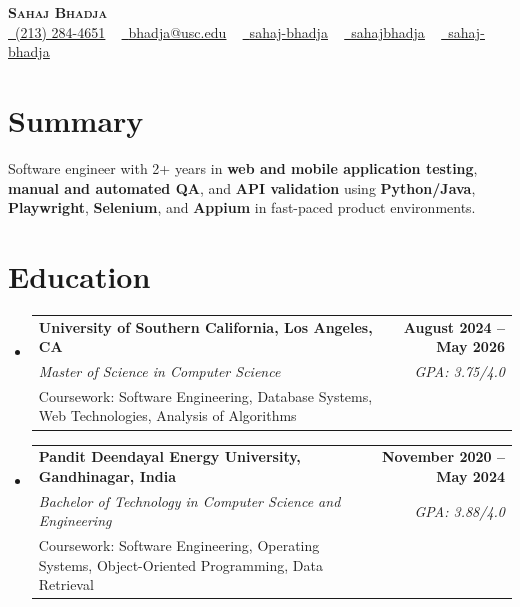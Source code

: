 \documentclass[letterpaper,10pt]{article}
\makeatletter
\newcommand{\resumeEduSubheading}[5]{\vspace{-1pt}\item\begin{tabular*}{1.0\textwidth}[t]{l@{\extracolsep{\fill}}r}\textbf{#1} & \textbf{\small #2} \\\textit{\small #3} & \textit{\small #4} \\\small #5 & \\\end{tabular*}\vspace{-4pt}}
\newcommand{\resumeSubHeadingListStart}{\begin{itemize}[leftmargin=0.0in, label={}]}
\newcommand{\resumeSubHeadingListEnd}{\end{itemize}}
\makeatother
\begin{document}
\begin{center}
{\Huge \scshape \textbf{Sahaj Bhadja}} \\ \vspace{1pt}
\small \href{tel:(213) 284-4651}{\faPhone\ \underline{(213) 284-4651}} ~ \href{mailto:bhadja@usc.edu}{\raisebox{-0.2\height}\faEnvelope\ \underline{bhadja@usc.edu}} ~
\href{https://www.linkedin.com/in/sahaj-bhadja/}{\raisebox{-0.2\height}\faLinkedin\ \underline{sahaj-bhadja}} ~ \href{https://github.com/SAHAJ-BHADJA}{\raisebox{-0.2\height}\faGithub\ \underline{sahajbhadja}} ~
\href{https://sahaj-bhadja.vercel.app/}{\raisebox{-0.2\height}\faGlobe\ \underline{sahaj-bhadja}}
\end{center}
\vspace{-18pt}
\section{Summary}
\begin{itemize}[leftmargin=0.15in, label={}]
\small{\item{Software engineer with 2+ years in \textbf{web and mobile application testing}, \textbf{manual and automated QA}, and \textbf{API validation} using \textbf{Python/Java}, \textbf{Playwright}, \textbf{Selenium}, and \textbf{Appium} in fast-paced product environments.}}
\end{itemize}
\vspace{-16pt}
\section{Education}
\resumeSubHeadingListStart
\resumeEduSubheading{University of Southern California, Los Angeles, CA}{August 2024 -- May 2026}{Master of Science in Computer Science}{GPA: 3.75/4.0}{Coursework: Software Engineering, Database Systems, Web Technologies, Analysis of Algorithms}
\vspace{-9pt}
\resumeEduSubheading{Pandit Deendayal Energy University, Gandhinagar, India}{November 2020 -- May 2024}{Bachelor of Technology in Computer Science and Engineering}{GPA: 3.88/4.0}{Coursework: Software Engineering, Operating Systems, Object-Oriented Programming, Data Retrieval}
\resumeSubHeadingListEnd
\vspace{-14pt}
\end{document}
